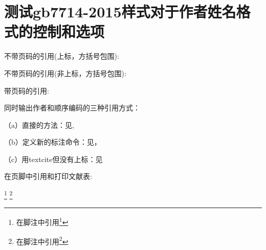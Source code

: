 \documentclass[twoside]{article}
\begin{document}
    \section{测试gb7714-2015样式对于作者姓名格式的控制和选项}

 不带页码的引用(上标，方括号包围):
 \cite{FOURNEY1971-17-38}\cite{wang2006another}

 不带页码的引用(非上标，方括号包围):
 \parencite{FOURNEY1971-17-38}\parencite{wang2006another}

 带页码的引用:
 \cite[见][49页]{FOURNEY1971-17-38} \parencite[见][49页]{wang2006another}


 同时输出作者和顺序编码的三种引用方式：

（a）直接的方法：见\citeauthor{FOURNEY1971-17-38}\cite{FOURNEY1971-17-38}, \citeauthor{wang2006another}\cite{wang2006another}

（b）定义新的标注命令：见，

（c）用textcite但没有上标：见\textcite{FOURNEY1971-17-38,wang2006another}

 在页脚中引用和打印文献表:

 \footnote{在脚注中引用\footcite{FOURNEY1971-17-38}} 
 \footnote{在脚注中引用\footcite{wang2006another}} 

 \nocite{*}

    \printbibliography[category=kindsofnameformats,title=五种不同的姓名格式]

    \printbibliography[notcategory=kindsofnameformats,title=某种期刊的姓名格式]

    
\end{document}
